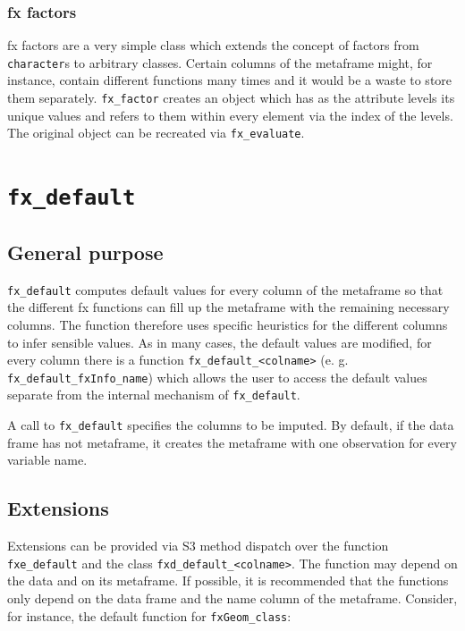 \documentclass[]{report}
\theoremstyle{definition}
\theoremstyle{definition}
\theoremstyle{definition}
\theoremstyle{remark}
\begin{document}
\subsubsection{fx factors}\label{fx-factors}

fx factors are a very simple class which extends the concept of factors
from \texttt{character}s to arbitrary classes. Certain columns of the
metaframe might, for instance, contain different functions many times
and it would be a waste to store them separately. \texttt{fx\_factor}
creates an object which has as the attribute levels its unique values
and refers to them within every element via the index of the levels. The
original object can be recreated via \texttt{fx\_evaluate}.

\section{\texorpdfstring{\texttt{fx\_default}}{fx\_default}}\label{fx_default}

\subsection{General purpose}\label{general-purpose}

\texttt{fx\_default} computes default values for every column of the
metaframe so that the different fx functions can fill up the metaframe
with the remaining necessary columns. The function therefore uses
specific heuristics for the different columns to infer sensible values.
As in many cases, the default values are modified, for every column
there is a function
\texttt{fx\_default\_\textless{}colname\textgreater{}} (e. g.
\texttt{fx\_default\_fxInfo\_name}) which allows the user to access the
default values separate from the internal mechanism of
\texttt{fx\_default}.

A call to \texttt{fx\_default} specifies the columns to be imputed. By
default, if the data frame has not metaframe, it creates the metaframe
with one observation for every variable name.

\subsection{Extensions}\label{extensions}

Extensions can be provided via S3 method dispatch over the function
\texttt{fxe\_default} and the class
\texttt{fxd\_default\_\textless{}colname\textgreater{}}. The function
may depend on the data and on its metaframe. If possible, it is
recommended that the functions only depend on the data frame and the
name column of the metaframe. Consider, for instance, the default
function for \texttt{fxGeom\_class}:
\end{document}
